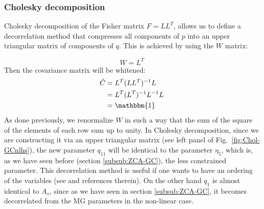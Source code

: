 \subsubsection{Cholesky decomposition}

Cholesky decomposition of the Fisher matrix $F=LL^{T}$, allows us to
define a decorrelation method that compresses
all components of $p$ into an upper triangular matrix of components
of $q$. This is achieved by using the $W$ matrix:

\begin{equation}
W=L^{T}
\end{equation}
Then the covariance matrix will be whitened:
\begin{align}
\tilde{C} & =L^{T} (L L^{T})^{-1} L\\
& =L^{T} (L^{T})^{-1} L^{-1} L\\
& =\mathbbm{1}
\end{align}
As done previously, we renormalize $W$ in such a way that the sum of the square of the elements of each row sum up to
unity.
In Cholesky decomposition, since we are constructing it via an upper triangular matrix (see left panel of Fig.\ \ref{fig:Chol-GCnlhs}), 
the new parameter $q_{11}$ will be identical 
to the parameter $\eta_5$, which is, as we have seen before (section \ref{subsub:ZCA-GC}), the less constrained parameter. This decorrelation method
is useful if one wants to have an ordering of the variables (see \cite{kessy_optimal_2015} and references therein).
On the other hand $q_1$ is almost identical to $A_s$, since as we have seen in section \ref{subsub:ZCA-GC},
it becomes decorrelated from the MG parameters in the non-linear case.

